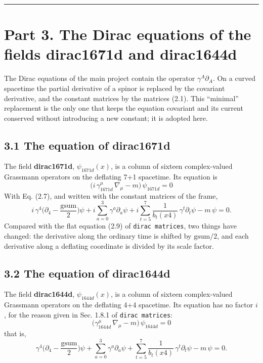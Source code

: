\documentclass[
  10pt,
]{article}
\begin{document}
\begin{center}\rule{0.5\linewidth}{0.5pt}\end{center}

\hypertarget{part-3.-the-dirac-equations-of-the-fields-dirac1671d-and-dirac1644d}{%
\section{Part 3. The Dirac equations of the fields dirac1671d and
dirac1644d}\label{part-3.-the-dirac-equations-of-the-fields-dirac1671d-and-dirac1644d}}

The Dirac equations of the main project contain the operator
\(\gamma^A\partial_A\). On a curved spacetime the partial derivative of
a spinor is replaced by the covariant derivative, and the constant
matrices by the matrices (2.1). This ``minimal'' replacement is the only
one that keeps the equation covariant and its current conserved without
introducing a new constant; it is adopted here.

\hypertarget{the-equation-of-dirac1671d}{%
\subsection{3.1 The equation of
dirac1671d}\label{the-equation-of-dirac1671d}}

The field \textbf{dirac1671d}, \(\psi_{1671d}(x)\), is a column of
sixteen complex-valued Grassmann operators on the deflating 7+1
spacetime. Its equation is
\[\boxed{\;\big(i\,\gamma_{1671d}^\mu\,\nabla_\mu-m\big)\,\psi_{1671d}=0\;}\tag{3.1}\]
With Eq. (2.7), and written with the constant matrices of the frame,
\[i\,\gamma^4\Big(\partial_4-\frac{\mathrm{gsum}}2\Big)\psi+i\sum_{a=0}^3\gamma^a\partial_a\psi
+i\sum_{t=5}^7\frac{1}{b_t(x4)}\,\gamma^t\partial_t\psi-m\,\psi=0 .\tag{3.2}\]
Compared with the flat equation (2.9) of \texttt{dirac\ matrices}, two
things have changed: the derivative along the ordinary time is shifted
by \(\mathrm{gsum}/2\), and each derivative along a deflating coordinate
is divided by its scale factor.

\hypertarget{the-equation-of-dirac1644d}{%
\subsection{3.2 The equation of
dirac1644d}\label{the-equation-of-dirac1644d}}

The field \textbf{dirac1644d}, \(\psi_{1644d}(x)\), is a column of
sixteen complex-valued Grassmann operators on the deflating 4+4
spacetime. Its equation has no factor \(i\), for the reason given in
Sec. 1.8.1 of \texttt{dirac\ matrices}:
\[\boxed{\;\big(\gamma_{1644d}^\mu\,\nabla_\mu-m\big)\,\psi_{1644d}=0\;}\tag{3.3}\]
that is,
\[\gamma^4\Big(\partial_4-\frac{\mathrm{gsum}}2\Big)\psi+\sum_{a=0}^3\gamma^a\partial_a\psi
+\sum_{t=5}^7\frac{1}{b_t(x4)}\,\gamma^t\partial_t\psi-m\,\psi=0 .\tag{3.4}\]
\end{document}
